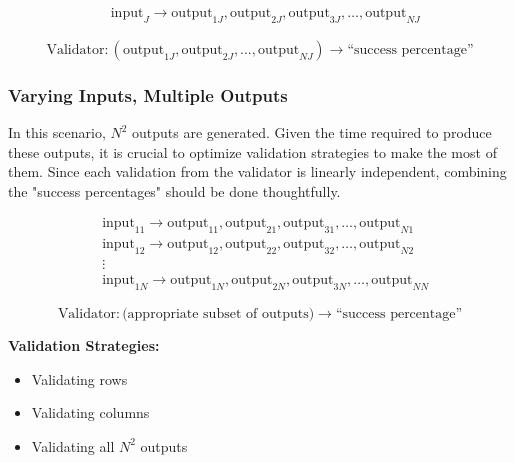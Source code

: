 \documentclass{article}
\begin{document}
\begin{equation*}
\begin{aligned}
&\text{input}_J \rightarrow \text{output}_{1J}, \text{output}_{2J}, \text{output}_{3J}, \ldots, \text{output}_{NJ}
\end{aligned}
\end{equation*}

\begin{equation*}
\text{Validator}: (\text{output}_{1J}, \text{output}_{2J}, \ldots, \text{output}_{NJ}) \rightarrow \text{``success percentage''}
\end{equation*}

\subsubsection{Varying Inputs, Multiple Outputs}
In this scenario, \( N^2 \) outputs are generated. Given the time required to produce these outputs, it is crucial to optimize validation strategies to make the most of them. Since each validation from the validator is linearly independent, combining the "success percentages" should be done thoughtfully.

\begin{equation*}
\begin{aligned}
&\text{input}_{11} \rightarrow \text{output}_{11}, \text{output}_{21}, \text{output}_{31}, \ldots, \text{output}_{N1} \\
&\text{input}_{12} \rightarrow \text{output}_{12}, \text{output}_{22}, \text{output}_{32}, \ldots, \text{output}_{N2} \\
&\vdots \\
&\text{input}_{1N} \rightarrow \text{output}_{1N}, \text{output}_{2N}, \text{output}_{3N}, \ldots, \text{output}_{NN}
\end{aligned}
\end{equation*}

\begin{equation*}
\text{Validator}: \text{(appropriate subset of outputs)} \rightarrow \text{``success percentage''}
\end{equation*}

\textbf{Validation Strategies:}
\begin{itemize}
    \item Validating rows
    \item Validating columns
    \item Validating all \(N^2\) outputs
\end{itemize}
\end{document}
